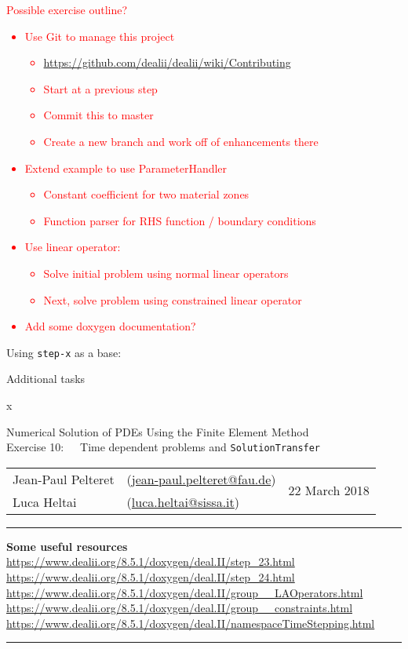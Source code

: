 \documentclass[11pt,answers]{exam}
\makeatletter
\newcommand{\makeheader}[3]{%
\setcounter{question}{0}
\begin{center}
{\sc Numerical Solution of PDEs Using the Finite Element Method}\vspace{2ex}\\
{\sc Exercise #1:\ \ \ #2}\vspace{2ex}\\
\begin{tabular*}{\textwidth}{ll @{\extracolsep{\fill}}r}
Jean-Paul Pelteret & (\url{jean-paul.pelteret@fau.de}) & \multirow{2}{*}{#3} \\
Luca Heltai & (\url{luca.heltai@sissa.it}) & \\
\end{tabular*}
\end{center}
}
\newcommand{\makeresources}[1]{%
\rule{\textwidth}{0.6mm}
\textbf{Some useful resources}\\[1.5ex]
#1 \par
\rule{\textwidth}{0.6mm}
}
\newcommand{\FINISHME}[1]{\textcolor{red}{#1}}
\makeatother
\begin{document}
\begin{questions}

\question \FINISHME{Possible exercise outline?}
\FINISHME{
\begin{itemize}
\item Use Git to manage this project
  \begin{itemize}
  \item \url{https://github.com/dealii/dealii/wiki/Contributing}
  \item Start at a previous step
  \item Commit this to master
  \item Create a new branch and work off of enhancements there
  \end{itemize}
\item Extend example to use ParameterHandler
  \begin{itemize}
  \item Constant coefficient for two material zones
  \item Function parser for RHS function / boundary conditions
  \end{itemize}
\item Use linear operator:
  \begin{itemize}
  \item Solve initial problem using normal linear operators
  \item Next, solve problem using constrained linear operator
  \end{itemize}
\item Add some doxygen documentation?
\end{itemize}
}

\question Using \verb|step-x| as a base:

\question Additional tasks
\begin{parts}
\bonuspart x
\end{parts}

\end{questions}




\clearpage
\makeheader{10}{Time dependent problems and \texttt{SolutionTransfer}}{22 March 2018}
\makeresources{%
\url{https://www.dealii.org/8.5.1/doxygen/deal.II/step_23.html} \\
\url{https://www.dealii.org/8.5.1/doxygen/deal.II/step_24.html} \\
\url{https://www.dealii.org/8.5.1/doxygen/deal.II/group__LAOperators.html} \\
\url{https://www.dealii.org/8.5.1/doxygen/deal.II/group__constraints.html} \\
\url{https://www.dealii.org/8.5.1/doxygen/deal.II/namespaceTimeStepping.html}
}
\end{document}

